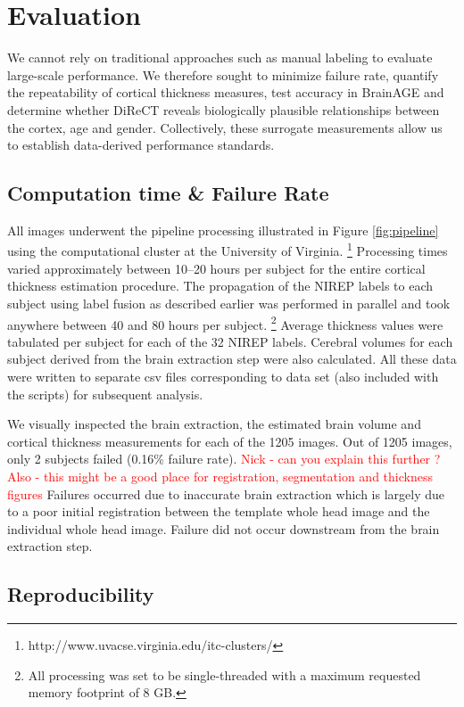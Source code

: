 \section{Evaluation}
We cannot rely on traditional approaches such as manual
labeling to evaluate large-scale performance.  We therefore sought to
minimize failure rate, quantify the repeatability of cortical
thickness measures, test accuracy in BrainAGE \cite{franke2010} and
determine whether DiReCT reveals biologically plausible relationships
between the cortex, age and gender.  Collectively, these surrogate
measurements allow us to establish data-derived performance standards.

\subsection{Computation time \& Failure Rate}
All images underwent the pipeline processing illustrated in Figure 
\ref{fig:pipeline} using the computational cluster at the University 
of Virginia.%
\footnote{
http://www.uvacse.virginia.edu/itc-clusters/
}  
Processing times varied approximately between 10--20 hours per subject
for the entire cortical thickness estimation procedure.  The propagation of the
NIREP labels to each subject using label fusion as described earlier
was performed in parallel and took anywhere between 40 and 80 hours per 
subject.%
\footnote{
All processing was set to be single-threaded with a maximum requested memory 
footprint of 8 GB.
}  
Average thickness values were tabulated per subject for each of the
32 NIREP labels.  Cerebral volumes for each subject derived from the brain 
extraction step were also calculated.  All these data were written to separate csv
files corresponding to data set (also included with the scripts) for subsequent 
analysis.

We visually inspected the brain extraction, the estimated brain volume
and cortical thickness measurements for each of the 1205 images.  Out
of 1205 images, only 2 subjects failed (0.16\% failure rate).
\textcolor{red}{ Nick - can you explain this further ? Also - this
  might be a good place for registration, segmentation and thickness
  figures } Failures
occurred due to inaccurate brain extraction which is largely due to a
poor initial registration between the template whole head image and the
individual whole head image.  Failure did not occur
downstream from the brain extraction step.  

\subsection{Reproducibility}

